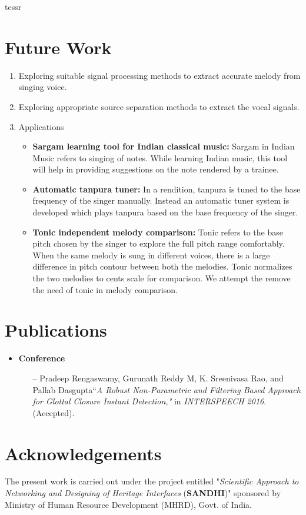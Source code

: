 \documentclass[times, 11pt, a4paper]{article}
\begin{document}
tessr

\section{Future Work}
\begin{enumerate}
\item Exploring suitable signal processing methods to extract accurate melody from singing voice.
\item Exploring appropriate source separation methods to extract the vocal signals.
\item Applications
\begin{itemize}
	\item \textbf{Sargam learning tool for Indian classical music:} Sargam in Indian Music refers to singing of notes. While learning Indian music, this tool will help in providing suggestions on the note rendered by a trainee.
	\item \textbf{Automatic tanpura tuner:} In a rendition, tanpura is tuned to the base frequency of the singer manually. Instead an automatic tuner system is developed which plays tanpura based on the base frequency of the singer.
	\item \textbf{Tonic independent melody comparison:} Tonic refers to the base pitch chosen by the singer to explore the full pitch range comfortably. 			When the same melody is sung in different voices, there is a large difference in pitch contour between both the melodies. Tonic normalizes the two 					melodies 	to cents scale for comparison. We attempt the remove the need of tonic in melody comparison.

\end{itemize}

\end{enumerate}


\section*{Publications} 
\begin{itemize}
\item \textbf{Conference}
	\begin{itemize}
	 	\item[--]  Pradeep Rengaswamy, Gurunath Reddy M,  K. Sreenivasa Rao,  and Pallab Dasgupta``\textit{A Robust Non-Parametric and Filtering Based Approach for Glottal Closure Instant Detection,"} in \textit{INTERSPEECH 2016}. (Accepted).
	 	\end{itemize}
\end{itemize}
	 


\section*{Acknowledgements}
The present work is carried out under the project entitled "\textit{Scientific Approach to Networking and Designing of Heritage Interfaces} (\textbf{SANDHI})" sponsored by Ministry of Human Resource Development (MHRD), Govt. of India.

\newpage


\end{document}
